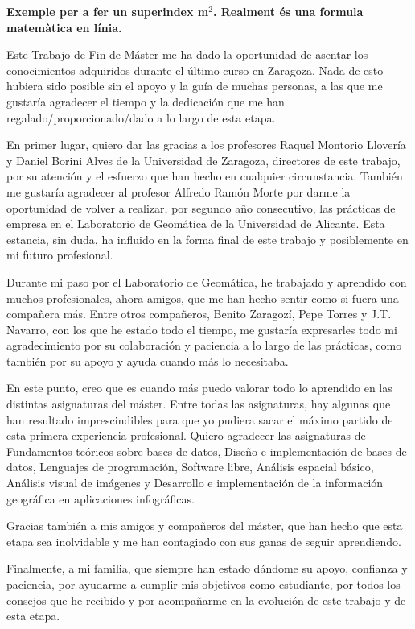 
\begin{acknowledgements}

\textbf{Exemple per a fer un superindex m$ ^{2} $. Realment és una formula matemàtica en línia.}



Este Trabajo de Fin de Máster me ha dado la oportunidad de asentar los conocimientos adquiridos durante el último curso en Zaragoza. Nada de esto hubiera sido posible sin el apoyo y la guía de muchas personas, a las que me gustaría agradecer el tiempo y la dedicación que me han regalado/proporcionado/dado a lo largo de esta etapa.

En primer lugar, quiero dar las gracias a los profesores Raquel Montorio Llovería y Daniel Borini Alves de la Universidad de Zaragoza, directores de este trabajo, por su atención y el esfuerzo que han hecho en cualquier circunstancia. También me gustaría agradecer al profesor Alfredo Ramón Morte por darme la oportunidad de volver a realizar, por segundo año consecutivo, las prácticas de empresa en el Laboratorio de Geomática de la Universidad de Alicante. Esta estancia, sin duda, ha influido en la forma final de este trabajo y posiblemente en mi futuro profesional.

Durante mi paso por el Laboratorio de Geomática, he trabajado y aprendido con muchos profesionales, ahora amigos, que me han hecho sentir como si fuera una compañera más. Entre otros compañeros, Benito Zaragozí, Pepe Torres y J.T. Navarro, con los que he estado todo el tiempo, me gustaría expresarles todo mi agradecimiento por su colaboración y paciencia a lo largo de las prácticas, como también por su apoyo y ayuda cuando más lo necesitaba.

En este punto, creo que es cuando más puedo valorar todo lo aprendido en las distintas asignaturas del máster. Entre todas las asignaturas, hay algunas que han resultado imprescindibles para que yo pudiera sacar el máximo partido de esta primera experiencia profesional. Quiero agradecer  las asignaturas de Fundamentos teóricos sobre bases de datos, Diseño e implementación de bases de datos, Lenguajes de programación, Software libre, Análisis espacial básico, Análisis visual de imágenes y Desarrollo e implementación de la información geográfica en aplicaciones infográficas.

Gracias también a mis amigos y compañeros del máster, que han hecho que esta etapa sea inolvidable y me han contagiado con sus ganas de seguir aprendiendo.

Finalmente, a mi familia, que siempre han estado dándome su apoyo, confianza y paciencia, por ayudarme a cumplir mis objetivos como estudiante, por todos los consejos que he recibido y por acompañarme en la evolución de este trabajo y de esta etapa.


  

\end{acknowledgements}

